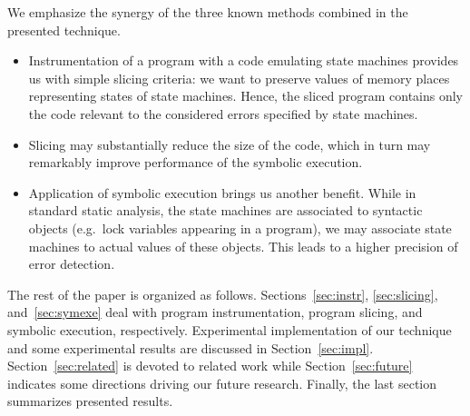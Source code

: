\documentclass[10pt]{llncs}
\newcommand\Color[2]{\textcolor{#1}{#2}}
\newcommand{\nb}[1]{\marginpar{\scriptsize #1}}
\newcommand\todo[1]{\nb{\Color{red}{#1}}}
\renewcommand\todo[1]{#1}
\begin{document}
We emphasize the synergy of the three known methods combined in the
presented technique.
\begin{itemize}
\item Instrumentation of a program with a code emulating state machines
provides us with simple slicing criteria: we want to preserve values of memory
places representing states of state machines. Hence, the sliced program
contains only the code relevant to the considered errors specified by state
machines.
\item Slicing may substantially reduce the size of the code, which in turn may
  remarkably improve performance of the symbolic execution.
\item Application of symbolic execution brings us another benefit. While in
  standard static analysis, the state machines are associated to syntactic
  objects (e.g.~lock variables appearing in a program), we may associate
  state machines to actual values of these objects. This leads to a higher
  precision of error detection.
\end{itemize}

The rest of the paper is organized as follows.
Sections~\ref{sec:instr}, \ref{sec:slicing}, and~\ref{sec:symexe} deal with
program instrumentation, program slicing, and symbolic execution,
respectively.
Experimental implementation of our technique and some experimental results
are discussed in Section~\ref{sec:impl}. Section~\ref{sec:related} is
devoted to related work while Section~\ref{sec:future} indicates some
directions driving our future research. Finally, the last section summarizes
presented results.



\end{document}
